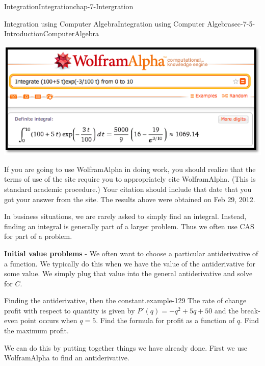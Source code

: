 \documentclass[oneside,10pt,]{book}
\newcommand{\terminology}[1]{\textbf{#1}}
\numberwithin{equation}{section}
\begin{document}
\begin{chapterptx}{Integration}{}{Integration}{}{}{chap-7-Intergration}
\begin{sectionptx}{Integration using Computer Algebra}{}{Integration using Computer Algebra}{}{}{sec-7-5-IntroductionComputerAlgebra}
\begin{sidebyside}{1}{0.1}{0.1}{0}
\begin{sbspanel}{0.8}
\includegraphics[width=1\linewidth]{images/sec7-5-13.png}
\end{sbspanel}%
\end{sidebyside}%
\par
\hypertarget{p-2895}{}%
If you are going to use Wolfram\textbar{}Alpha in doing work, you should realize that the terms of use of the site require you to appropriately cite Wolfram\textbar{}Alpha.  (This is standard academic procedure.)  Your citation should include that date that you got your answer from the site.  The results above were obtained on Feb 29, 2012.%
\par
\hypertarget{p-2896}{}%
In business situations, we are rarely asked to simply find an integral.  Instead, finding an integral is generally part of a larger problem.  Thus we often use CAS for part of a problem.%
\par
\hypertarget{p-2897}{}%
\terminology{Initial value problems} - We often want to choose a particular antiderivative of a function.  We typically do this when we have the value of the antiderivative for some value.  We simply plug that value into the general antiderivative and solve for \(C\).%
\begin{example}{Finding the antiderivative, then the constant.}{example-129}%
\hypertarget{p-2898}{}%
The rate of change profit with respect to quantity is given by \(P' (q)=-q^2+5q+50\) and the break-even point occurs when \(q=5\).  Find the formula for profit as a function of \(q\).  Find the maximum profit.%
\par
\hypertarget{p-2899}{}%
We can do this by putting together things we have already done.  First we use Wolfram\textbar{}Alpha to find an antiderivative.%
\begin{sidebyside}{1}{0.15}{0.15}{0}%
\begin{sbspanel}{0.7}%

\end{sbspanel}
\end{sidebyside}
\end{example}
\end{sectionptx}
\end{chapterptx}
\end{document}
